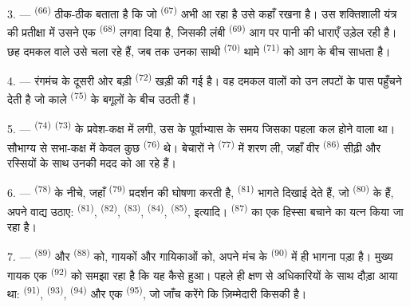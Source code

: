 3. ---  \textsuperscript{(66)} ठीक-ठीक बताता है कि जो
 \textsuperscript{(67)} अभी आ रहा है उसे कहाँ रखना है। उस
शक्तिशाली यंत्र की प्रतीक्षा में उसने एक  \textsuperscript{(68)}
लगवा दिया है, जिसकी लंबी  \textsuperscript{(69)} आग पर पानी की धाराएँ
उड़ेल रही है। छह दमकल वाले उसे चला रहे हैं, जब तक उनका साथी 
\textsuperscript{(70)} थामे  \textsuperscript{(71)} को आग के बीच साधता
है।

4. --- रंगमंच के दूसरी ओर बड़ी  \textsuperscript{(72)} खड़ी की गई
है। वह दमकल वालों को उन लपटों के पास पहुँचने देती है जो काले 
\textsuperscript{(75)} के बगूलों के बीच उठती हैं।

\VUsaut{5.0mm}
\VUsaut{3.4mm}

5. ---  \textsuperscript{(74)}  \textsuperscript{(73)} के
प्रवेश-कक्ष में लगी, उस  के पूर्वाभ्यास के समय जिसका पहला
 कल होने वाला था। सौभाग्य से सभा-कक्ष में केवल कुछ
 \textsuperscript{(76)} थे। बेचारों ने 
\textsuperscript{(77)} में शरण ली, जहाँ वीर  \textsuperscript{(86)}
सीढ़ी और रस्सियों के साथ उनकी मदद को आ रहे हैं।

6. ---  \textsuperscript{(78)} के नीचे, जहाँ
 \textsuperscript{(79)} प्रदर्शन की घोषणा करती है,
 \textsuperscript{(81)} भागते दिखाई देते हैं, जो
 \textsuperscript{(80)} के हैं, अपने वाद्य उठाए:
 \textsuperscript{(81)},  \textsuperscript{(82)},
 \textsuperscript{(83)},  \textsuperscript{(84)},
 \textsuperscript{(85)}, इत्यादि। 
\textsuperscript{(87)} का एक हिस्सा बचाने का यत्न किया जा रहा है।

7. ---  \textsuperscript{(89)} और 
\textsuperscript{(88)} को, गायकों और गायिकाओं को, अपने मंच के 
\textsuperscript{(90)} में ही भागना पड़ा है। मुख्य गायक एक 
\textsuperscript{(92)} को समझा रहा है कि यह कैसे हुआ।  पहले ही
क्षण से अधिकारियों के साथ दौड़ा आया था:  \textsuperscript{(91)},
 \textsuperscript{(93)}, 
\textsuperscript{(94)} और एक  \textsuperscript{(95)}, जो जाँच
करेंगे कि ज़िम्मेदारी किसकी है।
\VUsaut{6.0mm}
\VUfilet{22mm}
